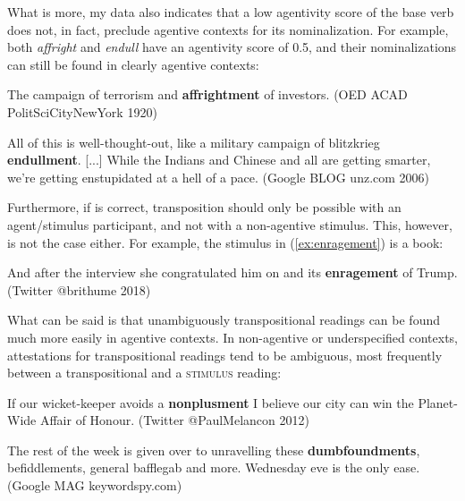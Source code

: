 \noindent What is more, my data also indicates that a low agentivity score of the base verb does not, in fact, preclude agentive contexts for its nominalization. For example, both \textit{affright} and \textit{endull} have an agentivity score of 0.5, and their nominalizations can still be found in clearly agentive contexts:

\begin{exe}
	\ex 
	\begin{xlist}
		\item \label{ex:affrightment} The campaign of terrorism and \textbf{affrightment} of investors. {\small(\acs{OED} ACAD PolitSciCityNewYork 1920)}
		\item \label{ex:endullment} All of this is well-thought-out, like a military campaign of blitzkrieg \textbf{endullment}. [...] While the Indians and Chinese and all are getting smarter, we're getting enstupidated at a hell of a pace. {\small(Google BLOG unz.com 2006)}
	\end{xlist}
\end{exe}

\noindent Furthermore, if \citet{Grimshaw.1990} is correct, transposition should only be possible with an agent/stimulus participant, and not with a non-agentive stimulus. This, however, is not the case either. For example, the stimulus in (\ref{ex:enragement}) is a book:

\begin{exe}
	\ex \label{ex:enragement} And after the interview she congratulated him on  and its \textbf{enragement} of Trump. {\small(Twitter @brithume 2018)}
\end{exe}

\noindent What can be said is that unambiguously transpositional readings can be found much more easily in agentive contexts. In non-agentive or underspecified contexts, attestations for transpositional readings tend to be ambiguous, most frequently between a transpositional and a \textsc{stimulus} reading:

\begin{exe}
	\ex 
	\begin{xlist}
	\item \label{ex:nonplusment} 
	If our wicket-keeper avoids a \textbf{nonplusment} I believe our city can win the Planet-Wide Affair of Honour. 
	{\small(Twitter @PaulMelancon 2012)}
	\item \label{ex:dumbfoundment} The rest of the week is given over to unravelling these \textbf{dumbfoundments}, befiddlements, general bafflegab and more. Wednesday eve is the only ease. {\small(Google MAG keywordspy.com)}
	\end{xlist}
\end{exe}


